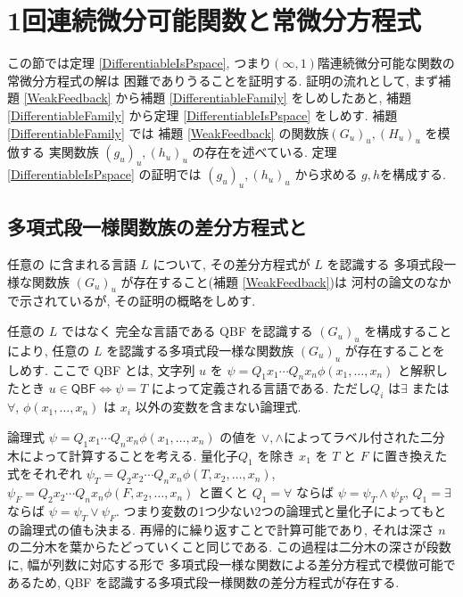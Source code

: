 \section{1回連続微分可能関数と常微分方程式}
\label{section:differentiable}

この節では定理 \ref{DifferentiableIsPspace},
つまり$(\infty, 1)$階連続微分可能な関数の常微分方程式の解は
\PSPACE 困難でありうることを証明する.
証明の流れとして, まず補題 \ref{WeakFeedback} から補題 \ref{DifferentiableFamily} をしめしたあと,
補題 \ref{DifferentiableFamily} から定理 \ref{DifferentiableIsPspace} をしめす.
補題 \ref{DifferentiableFamily} では
補題 \ref{WeakFeedback} の関数族$(G_u)_u, (H_u)_u$ を模倣する
実関数族 $(g_u)_u, (h_u)_u$ の存在を述べている.
定理 \ref{DifferentiableIsPspace} の証明では
$(g_u)_u, (h_u)_u$ から求める $g, h$を構成する.



\subsection{多項式段一様関数族の差分方程式と\PSPACE}


任意の \PSPACE に含まれる言語 $L$ について, 
その差分方程式が $L$ を認識する
多項式段一様な関数族 $(G_u)_u$ が存在すること(補題 \ref{WeakFeedback})は
河村の論文のなかで示されているが, その証明の概略をしめす.

任意の $L$ ではなく \PSPACE 完全な言語である
\textsf{QBF} を認識する $(G_u)_u$ を構成することにより,
任意の $L$ を認識する多項式段一様な関数族 $(G_u)_u$ が存在することをしめす.
ここで \textsf{QBF} とは,
文字列 $u$ を $\psi = Q_1 x_1 \cdots Q_n x_n \phi(x_1, \dots, x_n)$ と解釈したとき 
$u \in \textsf{QBF} \Leftrightarrow \psi = T$ によって定義される言語である. 
ただし$Q_i$ は$\exists$ または $\forall$,  
$\phi(x_1, \dots, x_n)$ は $x_i$ 以外の変数を含まない論理式. 

論理式 $\psi = Q_1 x_1 \cdots Q_n x_n \phi(x_1, \dots, x_n)$ の値を
$\vee, \wedge$によってラベル付された二分木によって計算することを考える. 
量化子$Q_1$ を除き $x_1$ を $T$ と $F$ に置き換えた式をそれぞれ
$\psi_T = Q_2 x_2 \cdots Q_n x_n \phi(T, x_2, \dots, x_n)$,
$\psi_F = Q_2 x_2 \cdots Q_n x_n \phi(F, x_2, \dots, x_n)$ と置くと
$Q_1=\forall$ ならば $\psi = \psi_T \wedge \psi_F$, 
$Q_1=\exists$ ならば $\psi = \psi_T \vee \psi_F$.
つまり変数の1つ少ない2つの論理式と量化子によってもとの論理式の値も決まる.
再帰的に繰り返すことで計算可能であり,
それは深さ $n$ の二分木を葉からたどっていくこと同じである.
この過程は二分木の深さが段数に, 幅が列数に対応する形で
多項式段一様な関数による差分方程式で模倣可能であるため,
\textsf{QBF} を認識する多項式段一様関数の差分方程式が存在する.



